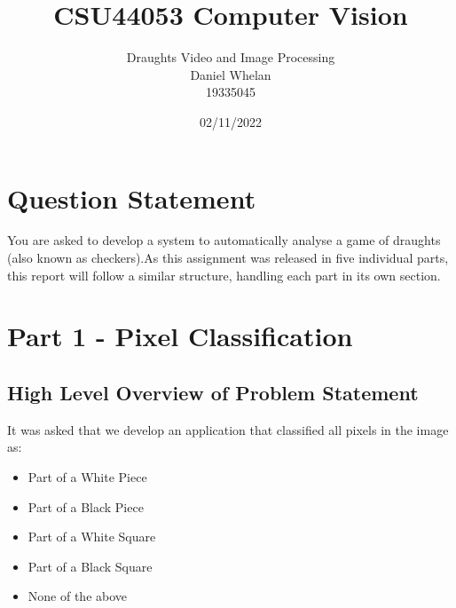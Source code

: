 \documentclass[11pt]{article}
\title{CSU44053 Computer Vision}
\author{Draughts Video and Image Processing \\ Daniel Whelan \\ 19335045}
\date{02/11/2022}
\begin{document}
\maketitle
\newpage

    \section*{Question Statement}
    You are asked to develop a system to automatically analyse a game of draughts (also known as checkers).As this assignment was released in five individual parts, this report will follow a similar structure, handling each part in its own section.
    \tableofcontents
    \newpage
    
    \section{Part 1 - Pixel Classification}
    \subsection{High Level Overview of Problem Statement}
    It was asked that we develop an application that classified all pixels in the image as:
    \begin{itemize}
        \item Part of a White Piece
        \item Part of a Black Piece
        \item Part of a White Square
        \item Part of a Black Square
        \item None of the above
    \end{itemize}
\end{document}
